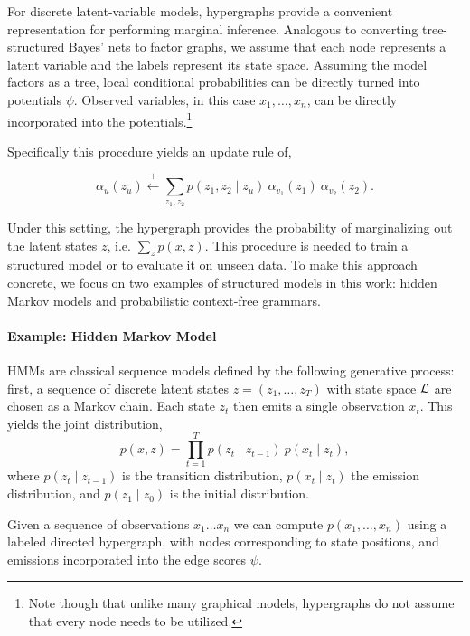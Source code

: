 \documentclass{article}
\begin{document}
For discrete latent-variable models, hypergraphs provide a convenient
representation for performing marginal inference.  Analogous to converting
tree-structured Bayes' nets to factor graphs, we assume that each node
represents a latent variable and the labels represent its state space.
Assuming the model factors as a tree, local conditional probabilities
can be directly turned into potentials $\psi$. Observed variables, in
this case $x_1, \ldots, x_n$, can be directly incorporated into the
potentials.\footnote{Note though that unlike many graphical models,
hypergraphs do not assume that every node needs to be utilized.}



Specifically this procedure yields an update rule of,

\[\alpha_u(z_u) \stackrel{+}{\gets} \displaystyle \sum_{z_1, z_2}  p(z_1, z_2 \mid z_u) \  \alpha_{v_1}(z_1) \  \alpha_{v_2}(z_2).\]

Under this setting, the hypergraph provides the probability of
marginalizing out the latent states $z$, i.e. $\sum_z p(x, z)$. This procedure is needed to train a structured model or to evaluate
it on unseen data. To make this approach concrete, we focus on two examples of structured
models in this work: hidden Markov models and probabilistic
context-free grammars.


\paragraph{Example: Hidden Markov Model}

HMMs are classical sequence models defined by the following generative process: first, a sequence of discrete latent states $z = (z_1, \ldots,z_T)$ with state space $\cal L$ are chosen as a Markov chain. Each state $z_t$ then emits a single observation $x_t$.
This yields the joint distribution,
\begin{equation}
\label{eqn:hmm}
    p(x,z) = \prod_{t=1}^T p(z_t \mid z_{t-1})\ p(x_t\mid z_t),
\end{equation}
where $p(z_t \mid z_{t-1})$ is the transition distribution,
 $p(x_t \mid z_t)$ the emission distribution, and $p(z_1 \mid z_0)$ is 
the initial distribution.

Given a sequence of observations $x_1 \ldots x_n$ we can compute 
$p(x_1, \ldots, x_n)$ using a labeled directed hypergraph, with nodes corresponding to state positions, and emissions incorporated into the edge scores $\psi$. 
\end{document}
